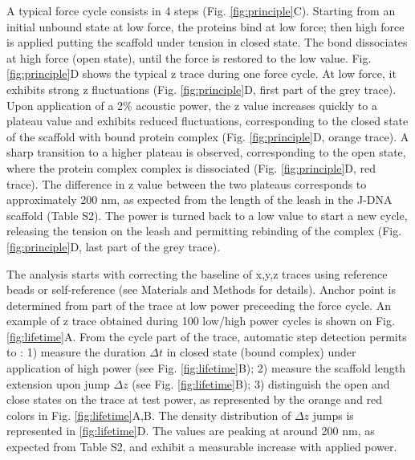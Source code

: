 \documentclass{biophys-new}
\begin{document}
A typical force cycle consists in 4 steps (Fig. \ref{fig:principle}C). Starting from an initial unbound state at low force, the proteins bind at low force; then high force is applied putting the scaffold under tension in closed state. The bond dissociates at high force (open state), until the force is restored to the low value. Fig. \ref{fig:principle}D shows the typical z trace during one force cycle. At low force, it exhibits strong z fluctuations (Fig. \ref{fig:principle}D, first part of the grey trace). Upon application of a 2\% acoustic power, the z value increases quickly to a plateau value and exhibits reduced fluctuations, corresponding to the closed state of the scaffold with bound protein complex (Fig. \ref{fig:principle}D, orange trace). A sharp transition to a higher plateau is observed, corresponding to the open state, where the protein complex complex is dissociated (Fig. \ref{fig:principle}D, red trace). The difference in z value between the two plateaus corresponds to approximately 200 nm, as expected from the length of the leash in the J-DNA scaffold (Table S2). The power is turned back to a low value to start a new cycle, releasing the tension on the leash and permitting rebinding of the complex (Fig. \ref{fig:principle}D, last part of the grey trace).

The analysis starts with correcting the baseline of x,y,z traces using reference beads or self-reference (see Materials and Methods for details). Anchor point is determined from part of the trace at low power preceeding the force cycle. An example of z trace obtained during 100 low/high power cycles is shown on Fig. \ref{fig:lifetime}A. From the cycle part of the trace, automatic step detection permits to : 1) measure the duration $\Delta t$ in closed state (bound complex) under application of high power (see Fig. \ref{fig:lifetime}B); 2) measure the scaffold length extension upon jump $\Delta z$ (see Fig. \ref{fig:lifetime}B); 3) distinguish the open and close states on the trace at test power, as represented by the orange and red colors in Fig. \ref{fig:lifetime}A,B.
The density distribution of $\Delta z$ jumps is represented in \ref{fig:lifetime}D. The values are peaking at around 200 nm, as expected from Table S2, and exhibit a measurable increase with applied power.
\end{document}
